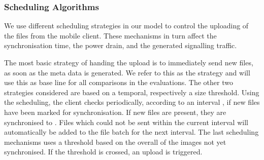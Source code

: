 \subsubsection*{Scheduling Algorithms}\label{sec:application:cloud_file_synchronisation:system_model:algorithms}
We use different scheduling strategies in our model to control the uploading of the files from the mobile client.
These mechanisms in turn affect the synchronisation time, the power drain, and the generated signalling traffic.

The most basic strategy of handing the upload is to immediately send new files, as soon as the meta data is generated.
We refer to this as the \algoimmediate strategy and will use this as base line for all comparisons in the evaluations.
The other two strategies considered are based on a temporal, respectively a size threshold. 
Using the \algointerval scheduling, the client checks periodically, according to an interval \thresholdInterval, if new files have been marked for synchronisation.
If new files are present, they are synchronised to \dropbox.
Files which could not be sent within the current interval will automatically be added to the file batch for the next interval. 
The last scheduling mechanisms uses a threshold \thresholdSize based on the overall \algosize of the images not yet synchronised.
If the threshold is crossed, an upload is triggered.
